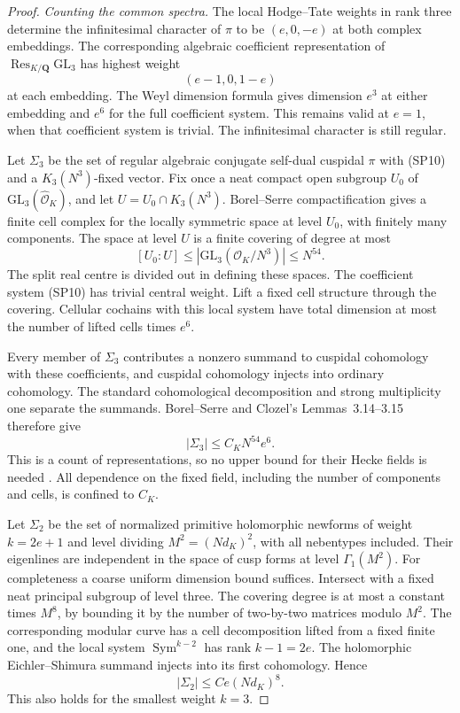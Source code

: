 \begin{proof}
\emph{Counting the common spectra.}
The local Hodge--Tate weights in rank three determine the
infinitesimal character of $\pi$ to be $(e,0,-e)$ at both
complex embeddings.  The corresponding algebraic coefficient
representation of $\operatorname{Res}_{K/\mathbf Q}
\mathrm{GL}_3$ has highest weight
\[
                      (e-1,0,1-e)                             \tag{SP10}
\]
at each embedding.  The Weyl dimension formula gives dimension
$e^3$ at either embedding and $e^6$ for the full coefficient
system.  This remains valid at $e=1$, when that coefficient
system is trivial.  The infinitesimal character is still regular.

Let $\Sigma_3$ be the set of regular algebraic conjugate self-dual
cuspidal $\pi$ with (SP10) and a $K_3(N^3)$-fixed vector.
Fix once a neat compact open subgroup $U_0$ of
$\mathrm{GL}_3(\widehat{\mathcal O}_K)$, and let
$U=U_0\cap K_3(N^3)$.  Borel--Serre compactification gives
a finite cell complex for the locally symmetric space at
level $U_0$, with finitely many components.  The space at
level $U$ is a finite covering of degree at most
\[
 [U_0:U]\le
 |\mathrm{GL}_3(\mathcal O_K/N^3)|\le N^{54}.                  \tag{SP11}
\]
The split real centre is divided out in defining these spaces.
The coefficient system (SP10) has trivial central weight.
Lift a fixed cell structure through the covering.  Cellular
cochains with this local system have total dimension at most
the number of lifted cells times $e^6$.

Every member of $\Sigma_3$ contributes a nonzero summand to
cuspidal cohomology with these coefficients, and cuspidal
cohomology injects into ordinary cohomology.  The standard
cohomological decomposition and strong multiplicity one
separate the summands.  Borel--Serre and Clozel's
Lemmas~3.14--3.15 therefore give
\[
                  |\Sigma_3|\le C_KN^{54}e^6.                 \tag{SP12}
\]
This is a count of representations, so no upper bound for
their Hecke fields is needed
\cite{support-spectrum-BorelSerre,support-spectrum-Clozel}.
All dependence on the fixed field, including the number of
components and cells, is confined to $C_K$.

Let $\Sigma_2$ be the set of normalized primitive holomorphic
newforms of weight $k=2e+1$ and level dividing $M^2=(Nd_K)^2$,
with all nebentypes included.  Their eigenlines are independent
in the space of cusp forms at level $\Gamma_1(M^2)$.
For completeness a coarse uniform dimension bound suffices.
Intersect with a fixed neat principal subgroup of level three.
The covering degree is at most a constant times $M^8$, by
bounding it by the number of two-by-two matrices modulo $M^2$.
The corresponding modular curve has a cell decomposition lifted
from a fixed finite one, and the local system
$\operatorname{Sym}^{k-2}$ has rank $k-1=2e$.
The holomorphic Eichler--Shimura summand injects into its first
cohomology.  Hence
\[
                  |\Sigma_2|\le C e(Nd_K)^8.                 \tag{SP13}
\]
This also holds for the smallest weight $k=3$.


\end{proof}
